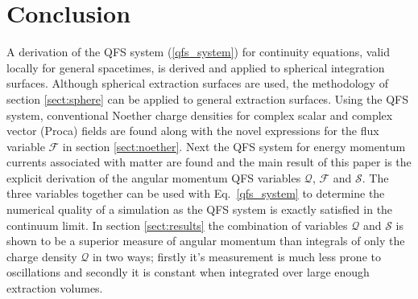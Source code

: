 
\section{Conclusion} \label{sect:conclusion}


A derivation of the QFS system (\ref{qfs_system}) for continuity equations, valid locally for general spacetimes, is derived and applied to spherical integration surfaces. Although spherical extraction surfaces are used, the methodology of section \ref{sect:sphere} can be applied to general extraction surfaces. Using the QFS system, conventional Noether charge densities for complex scalar and complex vector (Proca) fields are found along with the novel expressions for the flux variable $\mathcal{F}$ in section \ref{sect:noether}. Next the QFS system for energy momentum currents associated with matter are found and the main result of this paper is the explicit derivation of the angular momentum QFS variables $\mathcal{Q}$,  $\mathcal{F}$ and $\mathcal{S}$. The three variables together can be used with Eq.~\ref{qfs_system} to determine the numerical quality of a simulation as the QFS system is exactly satisfied in the continuum limit. In section \ref{sect:results} the combination of variables $\mathcal{Q}$ and $\mathcal{S}$ is shown to be a superior measure of angular momentum than integrals of only the charge density $\mathcal{Q}$ in two ways; firstly it's measurement is much less prone to oscillations and secondly it is constant when integrated over large enough extraction volumes.

